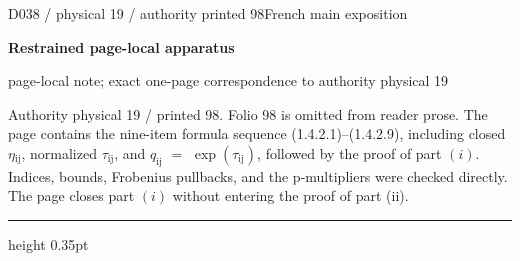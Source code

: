 \documentclass[9pt]{article}
\newcommand{\CanonText}[1]{\par{\fontsize{8.0}{9.35}\selectfont\RaggedRight #1\par}\vspace{2.2pt}}
\newcommand{\LayerTitle}{Restrained page-local apparatus}
\begin{document}
\noindent\begin{minipage}[t][\dimexpr\textheight-5pt\relax][t]{\textwidth}
{\sffamily\fontsize{7.3}{8.2}\selectfont\color{Quiet} D038 / physical 19 / authority printed 98\hfill French main exposition}
\par{}\vspace{4.5pt}
{\sffamily\fontsize{10.4}{11.6}\selectfont\bfseries\color{Accent} \LayerTitle}
\par{\sffamily\fontsize{6.7}{7.7}\selectfont\color{Quiet} page-local note; exact one-page correspondence to authority physical 19}
\vspace{5pt}
\CanonText{Authority physical 19 / printed 98. Folio 98 is omitted from reader prose. The page contains the nine-item formula sequence (1.4.2.1)–(1.4.2.9), including closed \(\eta{}_{\mathrm{ij}}\), normalized \(\tau{}_{\mathrm{ij}}\), and \(q_{\mathrm{ij}}\) \(=\) \(\operatorname{exp}(\tau{}_{\mathrm{ij}})\), followed by the proof of part \((i)\). Indices, bounds, Frobenius pullbacks, and the p-multipliers were checked directly. The page closes part \((i)\) without entering the proof of part (ii).}
\vfill
{\color{Accent}\hrule height 0.35pt}\vspace{3pt}
\end{minipage}
\newpage
\end{document}
